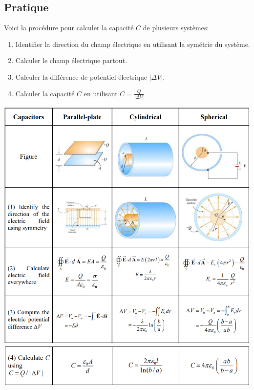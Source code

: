 \documentclass[a4paper]{article}
\begin{document}
\subsection{Pratique}






Voici la procédure pour calculer la capacité $ C $ de plusieurs systèmes: 
\begin{enumerate}
    \item Identifier la direction du champ électrique en utilisant la symétrie du système.
    \item Calculer le champ électrique partout.
    \item Calculer la différence de potentiel électrique $ | \Delta V | $.
    \item Calculer la capacité $ C $ en utilisant $\displaystyle C = \frac{Q}{| \Delta V |} $
\end{enumerate}

\begin{center}
    \includegraphics[width=\textwidth]{capacite2.PNG}
    \includegraphics[width=\textwidth]{capacite3.PNG}
\end{center}
\end{document}
